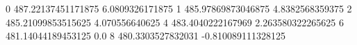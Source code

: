 0 487.22137451171875 6.0809326171875
1 485.97869873046875 4.8382568359375
2 485.21099853515625 4.070556640625
4 483.4040222167969 2.263580322265625
6 481.14044189453125 0.0
8 480.3303527832031 -0.810089111328125
